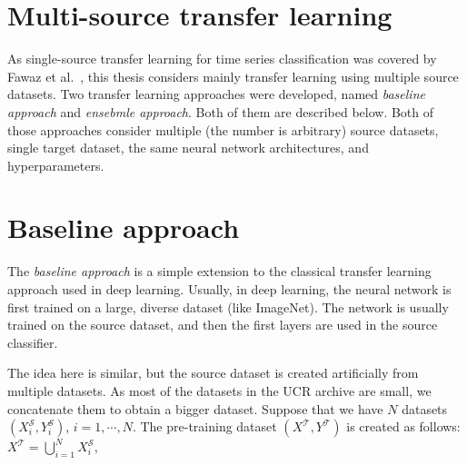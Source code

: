 \documentclass[a4paper,11pt,twoside]{report}
\theoremstyle{definition}
\begin{document}
\begin{table}[!h]
\caption{Summary of hyperparameters.}
\centering
\tabcolsep=0.11cm
\label{table:hyperparams}
\end{table}
\FloatBarrier
\section{Multi-source transfer learning}
As single-source transfer learning for time series classification was covered by Fawaz et al.~\cite{transfer_learning_time_series}, this thesis considers mainly transfer learning using multiple source datasets. Two transfer learning approaches were developed, named \textit{baseline approach} and \textit{ensebmle approach}. Both of them are described below. Both of those approaches consider multiple (the number is arbitrary) source datasets, single target dataset, the same neural network architectures, and hyperparameters.

\section{Baseline approach}\label{section:baseline}
The \textit{baseline approach} is a simple extension to the classical transfer learning approach used in deep learning. Usually, in deep learning, the neural network is first trained on a large, diverse dataset (like ImageNet). The network is usually trained on the source dataset, and then the first layers are used in the source classifier.

The idea here is similar, but the source dataset is created artificially from multiple datasets. As most of the datasets in the UCR archive are small, we concatenate them to obtain a bigger dataset. Suppose that we have $N$ datasets $(X_i^\mathcal{S}, Y_i^\mathcal{S})$, $i=1, \cdots, N$.
The pre-training dataset $(X^\mathcal{T}, Y^\mathcal{T})$ is created as follows:
$X^\mathcal{T} = \bigcup_{i=1}^N X_i^\mathcal{S}$,
\end{document}
